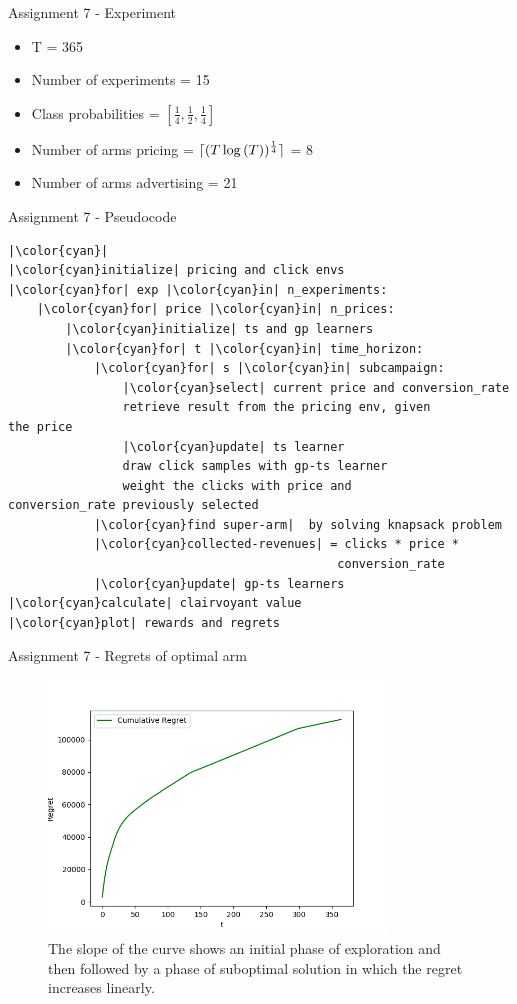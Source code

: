 \documentclass[11pt]{beamer}
\DeclarePairedDelimiter{\ceil}{\lceil}{\rceil}
\begin{document}
\begin{frame}{Assignment 7 - Experiment}
\begin{itemize}
\item T = 365
\item Number of experiments = 15
\item Class probabilities = \( \left[ \frac{1}{4}, \frac{1}{2}, \frac{1}{4} \right] \)
\item Number of arms pricing = $\ceil{(T \log{(T)})^{\frac{1}{4}}}$ = 8
\item Number of arms advertising = 21
\end{itemize}
\end{frame}

\begin{frame}[fragile]{Assignment 7 - Pseudocode}
\begin{lstlisting}
|\color{cyan}|
|\color{cyan}initialize| pricing and click envs
|\color{cyan}for| exp |\color{cyan}in| n_experiments:
	|\color{cyan}for| price |\color{cyan}in| n_prices:
		|\color{cyan}initialize| ts and gp learners 
		|\color{cyan}for| t |\color{cyan}in| time_horizon:
			|\color{cyan}for| s |\color{cyan}in| subcampaign:
				|\color{cyan}select| current price and conversion_rate 
				retrieve result from the pricing env, given 			 the price
				|\color{cyan}update| ts learner
				draw click samples with gp-ts learner
				weight the clicks with price and                   conversion_rate previously selected
			|\color{cyan}find super-arm|  by solving knapsack problem
			|\color{cyan}collected-revenues| = clicks * price *
											  conversion_rate
			|\color{cyan}update| gp-ts learners 
|\color{cyan}calculate| clairvoyant value
|\color{cyan}plot| rewards and regrets
\end{lstlisting}
\end{frame}

\begin{frame}{Assignment 7 - Regrets of optimal arm}
\begin{figure}[hbtp]
\centering
\includegraphics[width=0.8\textwidth]{images/assignment_7_regrets_arm_3_cum_regret.png}
\caption{The slope of the curve shows an initial phase of exploration and then followed by a phase of suboptimal solution in which the regret increases linearly.}
\end{figure}
\end{frame}
\end{document}
